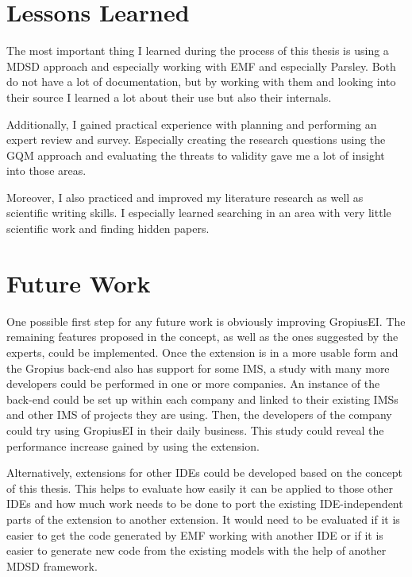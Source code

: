 \section{Lessons Learned}
\label{sec:ch6:s4}
The most important thing I learned during the process of this thesis is using a \gls{MDSD} approach 
and especially working with \gls{EMF} and especially \gls{Parsley}.
Both do not have a lot of documentation, but by working with them and looking into their source I learned a lot about their use but also their internals.

Additionally, I gained practical experience with planning and performing an expert review and survey.
Especially creating the research questions using the \gls{GQM} approach and evaluating the threats to validity gave me a lot of insight into those areas.

Moreover, I also practiced and improved my literature research as well as scientific writing skills.
I especially learned searching in an area with very little scientific work and finding hidden papers.

\section{Future Work}
\label{sec:ch6:s5}
One possible first step for any future work is obviously improving \gls{GropiusEI}.
The remaining features proposed in the concept, as well as the ones suggested by the experts, could be implemented.
Once the extension is in a more usable form and the \gls{Gropius} back-end also has support for some \gls{IMS},
a study with many more developers could be performed in one or more companies.
An instance of the back-end could be set up within each company and linked to their existing \glspl{IMS} and other \gls{IMS} of projects they are using.
Then, the developers of the company could try using \gls{GropiusEI} in their daily business.
This study could reveal the performance increase gained by using the extension.

Alternatively, extensions for other \glspl{IDE} could be developed based on the concept of this thesis.
This helps to evaluate how easily it can be applied to those other \glspl{IDE} and how much work needs to be done to port the existing \gls{IDE}-independent parts of the extension to another extension.
It would need to be evaluated if it is easier to get the code generated by \gls{EMF} working with another \gls{IDE} or if it is easier to generate new code from the existing models with the help of another \gls{MDSD} framework. 
